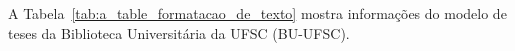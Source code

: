%
%
%
%
%
%



\chapter{}

A Tabela~\ref{tab:a_table_formatacao_de_texto} mostra  informações do modelo de
teses da Biblioteca Universitária da UFSC (BU-UFSC).

